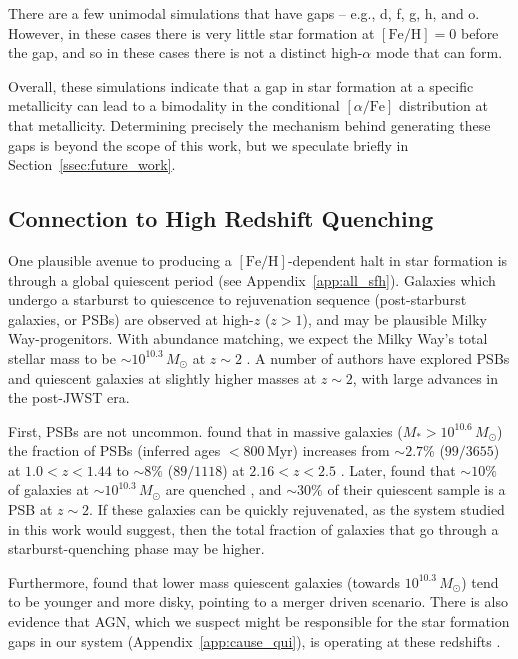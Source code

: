 \documentclass[twocolumn,linenumbers,trackchanges]{aastex631}
\newcommand{\Msun}{\ensuremath{M_{\odot}}}
\newcommand{\Myr}{\ensuremath{\textrm{Myr}}}
\newcommand{\FeH}{\ensuremath{[\textrm{Fe}/\textrm{H}]}}
\newcommand{\alphaFe}{\ensuremath{[\alpha/\textrm{Fe}]}}
\begin{document}
There are a few unimodal simulations that have gaps -- e.g., d, f, g, h, and o. However, in these cases there is very little star formation at $\FeH=0$ before the gap, and so in these cases there is not a distinct high-$\alpha$ mode that can form.

Overall, these simulations indicate that a gap in star formation at a specific metallicity can lead to a bimodality in the conditional \alphaFe{} distribution at that metallicity. Determining precisely the mechanism behind generating these gaps is beyond the scope of this work, but we speculate briefly in Section~\ref{ssec:future_work}.

\subsection{Connection to High Redshift Quenching}\label{ssec:obshiz}
One plausible avenue to producing a \FeH{}-dependent halt in star formation is through a global quiescent period (see Appendix~\ref{app:all_sfh}). Galaxies which undergo a starburst to quiescence to rejuvenation sequence (post-starburst galaxies, or PSBs) are observed at high-$z$ ($z>1$), and may be plausible Milky Way-progenitors. With abundance matching, we expect the Milky Way's total stellar mass to be $\sim10^{10.3}\,\Msun$ at $z\sim2$ \citep{2013ApJ...771L..35V}. A number of authors have explored PSBs and quiescent galaxies at slightly higher masses at $z\sim2$, with large advances in the post-JWST era.

First, PSBs are not uncommon. \citet{2023ApJ...953..119P} found that in massive galaxies ($M_* > 10^{10.6}\,\Msun$) the fraction of PSBs (inferred ages $< 800\,\Myr$) increases from $\sim2.7\%$ ($99/3655$) at $1.0 < z < 1.44$ to $\sim8\%$ ($89/1118$) at $2.16 < z < 2.5$ \citep[see also][]{2012ApJ...745..179W,2019ApJ...874...17B}. Later, \citet{2024arXiv240417945P} found that $\sim10\%$ of galaxies at $\sim10^{10.3}\,\Msun$ are quenched \citep[consistent with][]{2013ApJ...777...18M}, and $\sim30\%$ of their quiescent sample is a PSB at $z\sim2$. If these galaxies can be quickly rejuvenated, as the system studied in this work would suggest, then the total fraction of galaxies that go through a starburst-quenching phase may be higher.

Furthermore, \citet{2023arXiv231215012C} found that lower mass quiescent galaxies (towards $10^{10.3}\,\Msun$) tend to be younger and more disky, pointing to a merger driven scenario. There is also evidence that AGN, which we suspect might be responsible for the star formation gaps in our system (Appendix~\ref{app:cause_qui}), is operating at these redshifts \citep[e.g.][and references therein]{2023arXiv230806317D,2024arXiv240417945P,2024arXiv240518685M,2024Natur.630...54B}.
\end{document}
